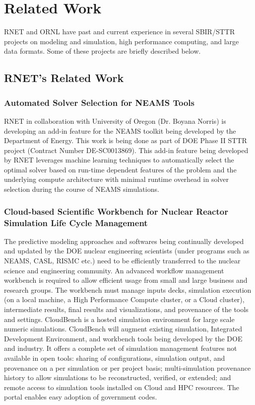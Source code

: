 
\section{Related Work}
\label{related}

RNET and ORNL have past and current experience in several SBIR/STTR projects on modeling and simulation, high performance computing, 
and large data formats. Some of these projects are briefly described below. 

\subsection{RNET's Related Work}

\subsubsection{Automated Solver Selection for NEAMS Tools}

RNET in collaboration with University of Oregon (Dr. Boyana Norris) is developing an add-in feature for the NEAMS 
toolkit being developed by the Department of Energy. This work is being done as part of DOE Phase II STTR project 
(Contract Number DE-SC0013869). This add-in feature being developed by RNET leverages machine learning techniques 
to automatically select the optimal solver based on run-time dependent features of the problem and the underlying 
compute architecture with minimal runtime overhead in solver selection during the course of NEAMS simulations. 


\subsubsection{Cloud-based Scientific Workbench for Nuclear Reactor Simulation Life Cycle Management}
The predictive modeling approaches and softwares being continually developed and updated by the DOE nuclear engineering scientists (under programs such as NEAMS, CASL, RISMC etc.) need to be efficiently transferred to the nuclear science and engineering community. An advanced workflow management workbench is required to allow efficient usage from small and large business and research groups. The workbench must manage inputs decks, simulation execution (on a local machine, a High Performance Compute cluster, or a Cloud cluster), intermediate results, final results and visualizations, and provenance of the tools and settings. CloudBench is a hosted simulation environment for large scale numeric simulations. CloudBench will augment existing simulation, Integrated Development Environment, and workbench tools being developed by the DOE and industry. It offers a complete set of simulation management features not available in open tools: sharing of configurations, simulation output, and provenance on a per simulation or per project basis; multi-simulation provenance history to allow simulations to be reconstructed, verified, or extended; and remote access to simulation tools installed on Cloud and HPC resources. The portal enables easy adoption of government codes. 

